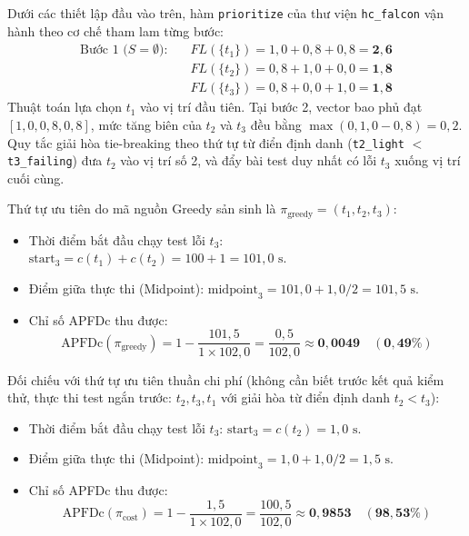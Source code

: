 Dưới các thiết lập đầu vào trên, hàm \texttt{prioritize} của thư viện \texttt{hc\_falcon} vận hành theo cơ chế tham lam từng bước:
\begin{align}
\text{Bước 1 ($S = \emptyset$):} \quad & FL(\{t_1\}) = 1{,}0 + 0{,}8 + 0{,}8 = \mathbf{2{,}6} \nonumber \\
& FL(\{t_2\}) = 0{,}8 + 1{,}0 + 0{,}0 = \mathbf{1{,}8} \nonumber \\
& FL(\{t_3\}) = 0{,}8 + 0{,}0 + 1{,}0 = \mathbf{1{,}8}
\end{align}
Thuật toán lựa chọn $t_1$ vào vị trí đầu tiên. Tại bước 2, vector bao phủ đạt $[1{,}0, 0{,}8, 0{,}8]$, mức tăng biên của $t_2$ và $t_3$ đều bằng $\max(0, 1{,}0 - 0{,}8) = 0{,}2$. Quy tắc giải hòa tie-breaking theo thứ tự từ điển định danh (\texttt{t2\_light} $<$ \texttt{t3\_failing}) đưa $t_2$ vào vị trí số 2, và đẩy bài test duy nhất có lỗi $t_3$ xuống vị trí cuối cùng.

Thứ tự ưu tiên do mã nguồn Greedy sản sinh là $\pi_{\text{greedy}} = (t_1, t_2, t_3)$:
\begin{itemize}
    \item Thời điểm bắt đầu chạy test lỗi $t_3$: $\text{start}_3 = c(t_1) + c(t_2) = 100 + 1 = 101{,}0\text{ s}$.
    \item Điểm giữa thực thi (Midpoint): $\text{midpoint}_3 = 101{,}0 + 1{,}0 / 2 = 101{,}5\text{ s}$.
    \item Chỉ số APFDc thu được:
    \begin{equation}
    \text{APFDc}(\pi_{\text{greedy}}) = 1 - \frac{101{,}5}{1 \times 102{,}0} = \frac{0{,}5}{102{,}0} \approx \mathbf{0{,}0049 \quad (0{,}49\%)}
    \end{equation}
\end{itemize}

Đối chiếu với thứ tự ưu tiên thuần chi phí (không cần biết trước kết quả kiểm thử, thực thi test ngắn trước: $t_2, t_3, t_1$ với giải hòa từ điển định danh $t_2 < t_3$):
\begin{itemize}
    \item Thời điểm bắt đầu chạy test lỗi $t_3$: $\text{start}_3 = c(t_2) = 1{,}0\text{ s}$.
    \item Điểm giữa thực thi (Midpoint): $\text{midpoint}_3 = 1{,}0 + 1{,}0 / 2 = 1{,}5\text{ s}$.
    \item Chỉ số APFDc thu được:
    \begin{equation}
    \text{APFDc}(\pi_{\text{cost}}) = 1 - \frac{1{,}5}{1 \times 102{,}0} = \frac{100{,}5}{102{,}0} \approx \mathbf{0{,}9853 \quad (98{,}53\%)}
    \end{equation}
\end{itemize}

